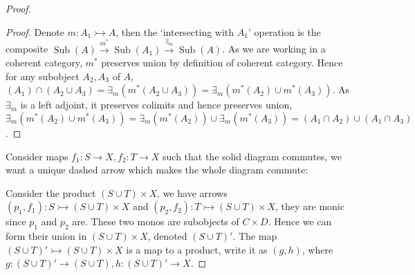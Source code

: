 \documentclass[a4paper]{article}
\DeclareMathOperator{\Sub}{\text {Sub}}
\begin{document}
\begin{proof}
    \begin{proof}

        Denote $m:A_1\rightarrowtail A$,
        then the `intersecting with $A_1$' operation is the composite $\Sub(A)\overset{m^*}\to \Sub(A_1)\overset{\exists_m}\to \Sub(A)$. As we are working in a coherent category, $m^*$ preserves union by definition of coherent category. Hence for any subobject $A_2,A_3$ of $A$, $(A_1)\cap (A_2\cup A_3) = \exists_m(m^*(A_2\cup A_3))= \exists_m(m^*(A_2)\cup m^*(A_3))$. As $\exists_m$ is a left adjoint, it preserves colimits and hence preserves union, $\exists_m(m^*(A_2)\cup m^*(A_3)) = \exists_m(m^*(A_2))\cup\exists_m(m^*(A_3)) = (A_1\cap A_2)\cup (A_1\cap A_3)$.

    \end{proof}




    Consider maps $f_1:S\to X,f_2:T\to X$ such that the solid diagram commutes, we want a unique dashed arrow which makes the whole diagram commute:

    \begin{center}
    \end{center}

    Consider the product $(S\cup T)\times X$, we have arrows $(p_1,f_1):S\rightarrowtail (S\cup T)\times X$ and $(p_2,f_2):T\rightarrowtail (S\cup T)\times X$, they are monic since $p_1$ and $p_2$ are. These two monos are subobjects of $C\times D$. Hence we can form their union in $(S\cup T)\times X$, denoted $(S\cup T)'$. The map $(S\cup T)'\rightarrowtail (S\cup T)\times X$ is a map to a product, write it as $(g,h)$, where $g:(S\cup T)'\to (S\cup T),h:(S\cup T)'\to X$.


\end{proof}
\end{document}
